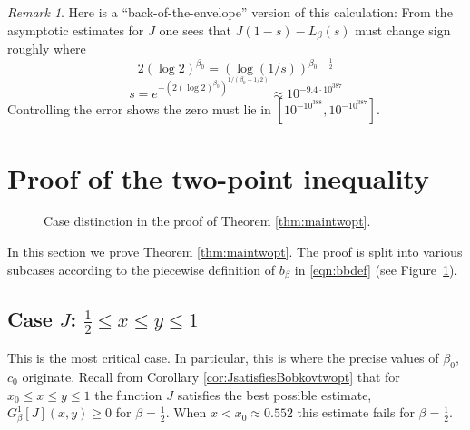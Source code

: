 \documentclass[12pt]{amsart}
\theoremstyle{plain}
\theoremstyle{definition}
\theoremstyle{remark}
\newtheorem{rem}[thm]{Remark}
\numberwithin{equation}{section}
\begin{document}
\begin{rem}
Here is a ``back-of-the-envelope'' version of this calculation: From the asymptotic estimates for $J$ one sees that $J(1-s)-L_\beta(s)$ must change sign roughly where
\[ 2(\log 2)^{\beta_0}=(\log(1/s))^{\beta_0-\frac12} \]
\[ s = e^{-(2(\log 2)^{\beta_0})^{1/(\beta_0-1/2)}} \approx 10^{-9.4\cdot 10^{387}} \]
Controlling the error shows the zero must lie in $[10^{-10^{388}}, 10^{-10^{387}}]$.
\end{rem}



\section{Proof of the two-point inequality}\label{sec:maintwopt}
\begin{figure}[th]
\centering
{}
\caption{Case distinction in the proof of Theorem \ref{thm:maintwopt}.}
\label{fig:cases}
\end{figure}

In this section we prove Theorem \ref{thm:maintwopt}. The proof is split into various subcases according to the piecewise definition of $b_\beta$ in \eqref{eqn:bbdef} (see Figure~\ref{fig:cases}).


\subsection{\texorpdfstring{Case $J$: $\frac12\le x\le y\le 1$}{Case J}}
\label{sec:caseJ}
This is the most critical case. In particular, this is where the precise values of $\beta_0$, $c_0$ originate.
Recall from Corollary \ref{cor:JsatisfiesBobkovtwopt} that for $x_0\le x\le y\le 1$ the function $J$ satisfies the best possible estimate, $G^1_{\beta}[J](x,y)\ge 0$ for $\beta=\frac12$. When $x<x_0\approx 0.552$ this estimate fails for $\beta=\frac12$.
\end{document}
